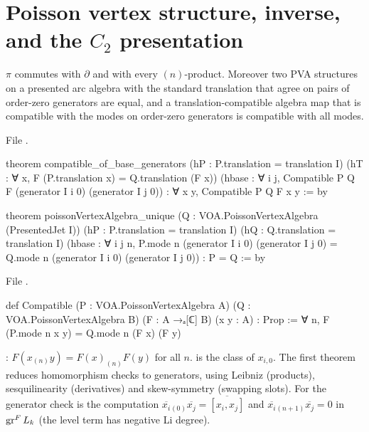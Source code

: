 \section{Poisson vertex structure, inverse, and the \texorpdfstring{$C_2$}{C2} presentation}\label{l20:sec:m8}

\begin{theorem}\label{l20:thm:pvahom}
$\pi$ commutes with $\partial$ and with every $(n)$-product. Moreover two PVA structures on a presented arc algebra
with the standard translation that agree on pairs of order-zero generators are equal, and a translation-compatible
algebra map that is compatible with the modes on order-zero generators is compatible with all modes.
\end{theorem}
\noindent File .
\begin{leancode}
theorem compatible_of_base_generators
    (hP : P.translation = translation I)
    (hT : ∀ x, F (P.translation x) = Q.translation (F x))
    (hbase : ∀ i j, Compatible P Q F (generator I i 0) (generator I j 0)) :
    ∀ x y, Compatible P Q F x y := by

theorem poissonVertexAlgebra_unique
    (Q : VOA.PoissonVertexAlgebra (PresentedJet I))
    (hP : P.translation = translation I) (hQ : Q.translation = translation I)
    (hbase : ∀ i j n, P.mode n (generator I i 0) (generator I j 0) =
      Q.mode n (generator I i 0) (generator I j 0)) : P = Q := by
\end{leancode}
\noindent File .
\begin{leancode}
def Compatible (P : VOA.PoissonVertexAlgebra A) (Q : VOA.PoissonVertexAlgebra B)
    (F : A →ₐ[ℂ] B) (x y : A) : Prop :=
  ∀ n, F (P.mode n x y) = Q.mode n (F x) (F y)
\end{leancode}

\begin{dictionary}
: $F(x_{(n)}y)=F(x)_{(n)}F(y)$ for all $n$.  is the class of $x_{i,0}$.
The first theorem reduces homomorphism checks to generators, using Leibniz (products), sesquilinearity (derivatives) and
skew-symmetry (swapping slots). For  the generator check is the computation
$\overline{x_i}{}_{(0)}\overline{x_j}=\overline{[x_i,x_j]}$ and $\overline{x_i}{}_{(n+1)}\overline{x_j}=0$ in $\operatorname{gr}^F L_k$
(the level term has negative Li degree).
\end{dictionary}

